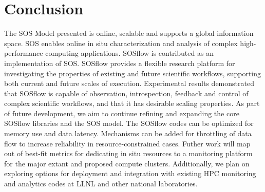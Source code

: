 

%
%
%

\section{Conclusion}
%
The SOS Model presented is online, scalable and supports a global
information space.
%
SOS enables online in situ characterization and analysis of complex
high-performance computing applications.
%
SOSflow is contributed as an implementation of SOS.
%
SOSflow provides a flexible research platform for investigating the
properties of existing and future scientific workflows, supporting
both current and future scales of execution.
%
Experimental results demonstrated that SOSflow is capable of
observation, introspection, feedback and control of complex scientific
workflows, and that it has desirable scaling properties.
%
As part of future development, we aim to continue refining and
expanding the core SOSflow libraries and the SOS model.
%
The SOSflow codes can be optimized for memory use and data latency.
%
Mechanisms can be added for throttling of data flow to increase
reliability in resource-constrained cases.
%
Futher work will map out of best-fit metrics for dedicating in situ
resources to a monitoring platform for the major extant and proposed
compute clusters.
%
Additionally, we plan on exploring options for deployment and
integration with existing HPC monitoring and analytics codes at LLNL
and other national laboratories.
%
%



